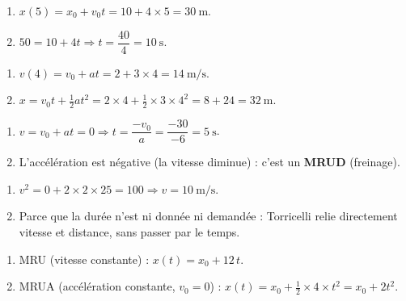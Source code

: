 \documentclass[11pt,a4paper]{article}
\begin{document}

\begin{corrige}
\begin{enumerate}[label=\alph*)]
  \item $x(5)=x_0+v_0t=10+4\times5=\qty{30}{\metre}$.
  \item $50=10+4t \Rightarrow t=\dfrac{40}{4}=\qty{10}{\second}$.
\end{enumerate}
\end{corrige}

\begin{corrige}
\begin{enumerate}[label=\alph*)]
  \item $v(4)=v_0+at=2+3\times4=\qty{14}{\metre\per\second}$.
  \item $x=v_0t+\tfrac12 at^2=2\times4+\tfrac12\times3\times4^2=8+24=\qty{32}{\metre}$.
\end{enumerate}
\end{corrige}

\begin{corrige}
\begin{enumerate}[label=\alph*)]
  \item $v=v_0+at=0 \Rightarrow t=\dfrac{-v_0}{a}=\dfrac{-30}{-6}=\qty{5}{\second}$.
  \item L'accélération est négative (la vitesse diminue) : c'est un \textbf{MRUD} (freinage).
\end{enumerate}
\end{corrige}

\begin{corrige}
\begin{enumerate}[label=\alph*)]
  \item $v^2=0+2\times2\times25=100 \Rightarrow v=\qty{10}{\metre\per\second}$.
  \item Parce que la durée n'est ni donnée ni demandée : Torricelli relie directement vitesse et distance, sans passer par le temps.
\end{enumerate}
\end{corrige}

\begin{corrige}
\begin{enumerate}[label=\alph*)]
  \item MRU (vitesse constante) : $x(t)=x_0+12\,t$.
  \item MRUA (accélération constante, $v_0=0$) : $x(t)=x_0+\tfrac12\times4\times t^2=x_0+2t^2$.
\end{enumerate}
\end{corrige}
\end{document}
